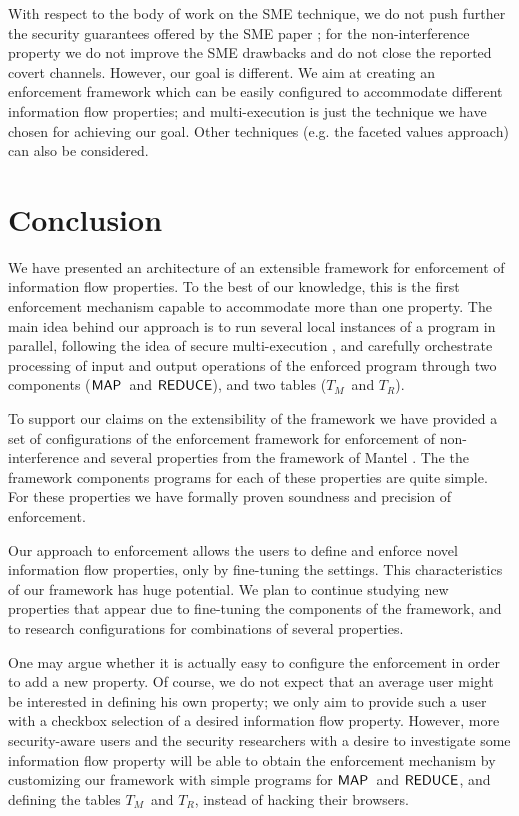 \documentclass[10pt,a4paper,oneside]{article}
\def\TAV{\ensuremath{T_{M}}}
\def\TPV{\ensuremath{T_{R}}}
\def\sanserif#1{\ensuremath{\sf #1}}
\def\REDUCE{\ensuremath{\sanserif{REDUCE}}}
\def\MAP{\ensuremath{\sanserif{MAP}}}
\begin{document}
With respect to the body of work on the SME technique, we do not push further the security guarantees offered by the SME paper \cite{Devr-Pies-10-IEEESP}; for the non-interference property we do not improve the SME drawbacks and do not close the reported covert channels. However, our goal is different. We aim at creating an enforcement framework which can be easily configured to accommodate different information flow properties; and multi-execution is just the technique we have chosen for achieving our goal. Other techniques (e.g. the faceted values approach) can also be considered.








\section{Conclusion}\label{sec:conclusion}
We have presented an architecture of an extensible framework for enforcement of information flow properties. To the best of our knowledge, this is the first enforcement mechanism capable to accommodate more than one property. The main idea behind our approach is to run several local instances of a program in parallel, following the idea of secure multi-execution \cite{Devr-Pies-10-IEEESP}, and carefully orchestrate processing of input and output operations of the enforced program through two components (\MAP\ and \REDUCE), and two tables (\TAV\ and \TPV).

To support our claims on the extensibility of the framework we have provided a set of configurations of the enforcement framework for enforcement of non-interference and several properties from the framework of Mantel \cite{MANT-00-CSF}. The the framework components programs for each of these properties are quite simple. For these properties we have formally proven soundness and precision of enforcement.

Our approach to enforcement allows the users to define and enforce novel information flow properties, only by fine-tuning the settings. This characteristics of our framework has huge potential. We plan to continue studying new properties that appear due to fine-tuning the components of the framework, and to research configurations for combinations of several properties.

One may argue whether it is actually easy to configure the enforcement in order to add a new property. Of course, we do not expect that an average user might be interested in defining his own property; we only aim to provide such a user with a checkbox selection of a desired information flow property. However, more security-aware users and the security researchers with a desire to investigate some information flow property will be able to obtain the enforcement mechanism by customizing our framework with simple programs for \MAP\ and \REDUCE, and defining the tables \TAV\ and \TPV, instead of hacking their browsers.
\end{document}
